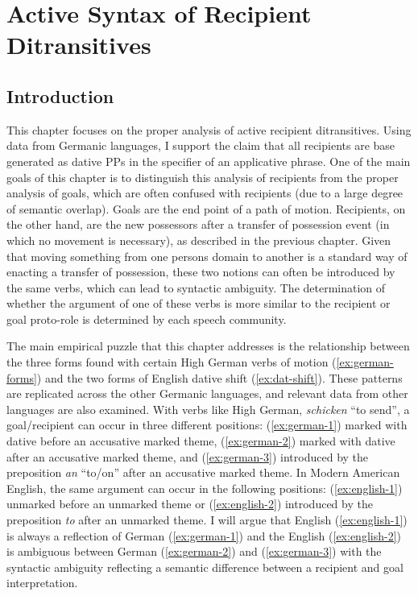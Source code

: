\chapter{Active Syntax of Recipient Ditransitives}\label{ch:active}
\section{Introduction}
This chapter focuses on the proper analysis of active recipient ditransitives. Using data from Germanic languages, I support the claim that all recipients are base generated as dative PPs in the specifier of an applicative phrase. One of the main goals of this chapter is to distinguish this analysis of recipients from the proper analysis of goals, which are often confused with recipients (due to a large degree of semantic overlap). Goals are the end point of a path of motion. Recipients, on the other hand, are the new possessors after a transfer of possession event (in which no movement is necessary), as described in the previous chapter. Given that moving something from one persons domain to another is a standard way of enacting a transfer of possession, these two notions can often be introduced by the same verbs, which can lead to syntactic ambiguity. The determination of whether the argument of one of these verbs is more similar to the recipient or goal proto-role is determined by each speech community.

The main empirical puzzle that this chapter addresses is the relationship between the three forms found with certain High German verbs of motion (\ref{ex:german-forms}) and the two forms of English dative shift (\ref{ex:dat-shift}). These patterns are replicated across the other Germanic languages, and relevant data from other languages are also examined. With verbs like High German, \textit{schicken} ``to send'', a goal/recipient can occur in three different positions: (\ref{ex:german-1}) marked with dative before an accusative marked theme, (\ref{ex:german-2}) marked with dative after an accusative marked theme, and (\ref{ex:german-3}) introduced by the preposition \textit{an} ``to/on'' after an accusative marked theme. In Modern American English, the same argument can occur in the following positions: (\ref{ex:english-1}) unmarked before an unmarked theme or (\ref{ex:english-2}) introduced by the preposition \textit{to} after an unmarked theme. I will argue that English (\ref{ex:english-1}) is always a reflection of German (\ref{ex:german-1}) and the English (\ref{ex:english-2}) is ambiguous between German (\ref{ex:german-2}) and (\ref{ex:german-3}) with the syntactic ambiguity reflecting a semantic difference between a recipient and goal interpretation.

